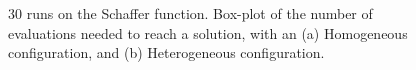 \documentclass[conference]{IEEEtran}
\begin{document}
%
\begin{figure}[t]
    \centering


    \caption{30 runs on the Schaffer function. Box-plot of the number of evaluations needed to reach a solution, with an (a) Homogeneous configuration, and (b) Heterogeneous configuration.}
    \label{fig:schaffer}
\end{figure}
%
\end{document}
